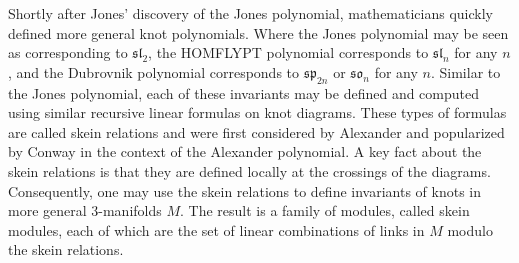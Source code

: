 Shortly after Jones' discovery of the Jones polynomial, mathematicians quickly defined more general knot polynomials. Where the Jones polynomial may be seen as corresponding to $\mathfrak{sl}_2$, the HOMFLYPT polynomial \cite{FHLMOY85} \cite{PT88} corresponds to $\mathfrak{sl}_n$ for any $n$, and the Dubrovnik polynomial \cite{Kau90} corresponds to $\mathfrak{sp}_{2n}$ or $\mathfrak{so}_n$ for any $n$. Similar to the Jones polynomial, each of these invariants may be defined and computed using similar recursive linear formulas on knot diagrams. These types of formulas are called skein relations and were first considered by Alexander \cite{Ale28} and popularized by Conway \cite{Con70} in the context of the Alexander polynomial. A key fact about the skein relations is that they are defined locally at the crossings of the diagrams. Consequently, one may use the skein relations to define invariants of knots in more general $3$-manifolds $M$. The result is a family of modules, called skein modules, each of which are the set of linear combinations of links in $M$ modulo the skein relations. 

